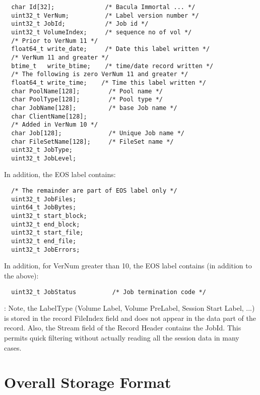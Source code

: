 \footnotesize
\begin{verbatim}
  char Id[32];              /* Bacula Immortal ... */
  uint32_t VerNum;          /* Label version number */
  uint32_t JobId;           /* Job id */
  uint32_t VolumeIndex;     /* sequence no of vol */
  /* Prior to VerNum 11 */
  float64_t write_date;     /* Date this label written */
  /* VerNum 11 and greater */
  btime_t   write_btime;    /* time/date record written */
  /* The following is zero VerNum 11 and greater */
  float64_t write_time;    /* Time this label written */
  char PoolName[128];        /* Pool name */
  char PoolType[128];        /* Pool type */
  char JobName[128];         /* base Job name */
  char ClientName[128];
  /* Added in VerNum 10 */
  char Job[128];             /* Unique Job name */
  char FileSetName[128];     /* FileSet name */
  uint32_t JobType;
  uint32_t JobLevel;
\end{verbatim}
\normalsize

In addition, the EOS label contains:

\footnotesize
\begin{verbatim}
  /* The remainder are part of EOS label only */
  uint32_t JobFiles;
  uint64_t JobBytes;
  uint32_t start_block;
  uint32_t end_block;
  uint32_t start_file;
  uint32_t end_file;
  uint32_t JobErrors;
\end{verbatim}
\normalsize

In addition, for VerNum greater than 10, the EOS label contains (in addition
to the above):

\footnotesize
\begin{verbatim}
  uint32_t JobStatus          /* Job termination code */
\end{verbatim}
\normalsize

: Note, the LabelType (Volume Label, Volume PreLabel, Session Start Label,
...) is stored in the record FileIndex field and does not appear in the data
part of the record. Also, the Stream field of the Record Header contains the
JobId. This permits quick filtering without actually reading all the session
data in many cases.

\section{Overall Storage Format}

